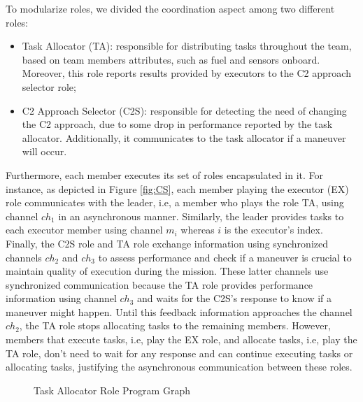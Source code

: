 To modularize roles, we divided the coordination aspect among two different roles:

\begin{itemize}
    \item Task Allocator (TA): responsible for distributing tasks throughout the team, based on team members attributes, such as fuel and sensors onboard. Moreover, this role reports results provided by executors to the C2 approach selector role;
    \item C2 Approach Selector (C2S): responsible for detecting the need of changing the C2 approach, due to some drop in performance reported by the task allocator. Additionally, it communicates to the task allocator if a maneuver will occur.  
\end{itemize}

Furthermore, each member executes its set of roles encapsulated in it. For instance, as depicted in Figure \ref{fig:CS}, each member playing the executor (EX) role communicates with the leader, i.e, a member who plays the role TA, using channel \textit{$ch_1$} in an asynchronous manner. Similarly, the leader provides tasks to each executor member using channel \textit{$m_i$} whereas $i$ is the executor's index. Finally, the C2S role and TA role exchange information using synchronized channels \textit{$ch_2$} and \textit{$ch_3$} to assess performance and check if a maneuver is crucial to maintain quality of execution during the mission. These latter channels use synchronized communication because the TA role provides performance information using channel \textit{$ch_3$} and waits for the C2S's response to know if a maneuver might happen. Until this feedback information approaches the channel \textit{$ch_2$}, the TA role stops allocating tasks to the remaining members. However, members that execute tasks, i.e, play the EX role, and allocate tasks, i.e, play the TA role, don't need to wait for any response and can continue executing tasks or allocating tasks, justifying the asynchronous communication between these roles.

\begin{figure}[!ht]
    \centering
    \scalebox{.65}{}
    \caption{Task Allocator Role Program Graph}
    \label{fig:TA}
\end{figure}

